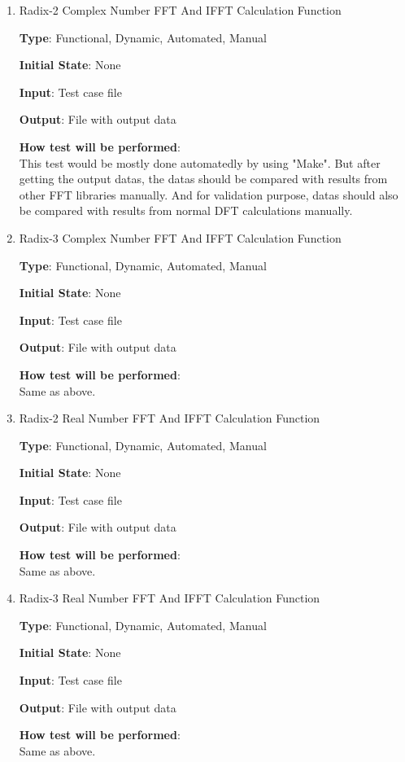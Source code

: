 \documentclass[12pt, titlepage]{article}
\begin{document}
\begin{enumerate}

\item{Radix-2 Complex Number FFT And IFFT Calculation Function\\}

\textbf {Type}: Functional, Dynamic, Automated, Manual
					
\textbf {Initial State}: None
					
\textbf {Input}: Test case file
					
\textbf {Output}:  File with output data
					
\textbf {How test will be performed}: \\
This test would be mostly done automatedly by using "Make". But after getting the output datas, the datas should be compared with results from other FFT libraries manually.
And for validation purpose, datas should also be compared with results from normal DFT calculations manually.
					
\item{Radix-3 Complex Number FFT And IFFT Calculation Function\\}

\textbf {Type}: Functional, Dynamic, Automated, Manual
					
\textbf {Initial State}: None
					
\textbf {Input}: Test case file
					
\textbf {Output}:  File with output data
					
\textbf {How test will be performed}: \\
Same as above.

\item{Radix-2 Real Number FFT And IFFT Calculation Function\\}

\textbf {Type}: Functional, Dynamic, Automated, Manual
					
\textbf {Initial State}: None
					
\textbf {Input}: Test case file
					
\textbf {Output}:  File with output data
					
\textbf {How test will be performed}: \\
Same as above.

\item{Radix-3 Real Number FFT And IFFT Calculation Function\\}

\textbf {Type}: Functional, Dynamic, Automated, Manual
					
\textbf {Initial State}: None
					
\textbf {Input}: Test case file
					
\textbf {Output}:  File with output data
					
\textbf {How test will be performed}: \\
Same as above.


\end{enumerate}
\end{document}
